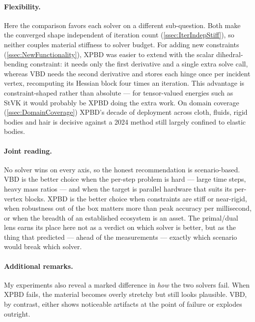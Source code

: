 \paragraph{Flexibility.}
Here the comparison favors each solver on a different sub-question. Both make
the converged shape independent of iteration count
(\autoref{ssec:IterIndepStiff}), so neither couples material stiffness to solver
budget. For adding new constraints (\autoref{ssec:NewFunctionality}), XPBD was
easier to extend with the scalar dihedral-bending constraint: it needs only the
first derivative and a single extra solve call, whereas VBD needs the second
derivative and stores each hinge once per incident vertex, recomputing its
Hessian block four times an iteration. This advantage is constraint-shaped rather
than absolute --- for tensor-valued energies such as StVK it would probably be
XPBD doing the extra work. On domain coverage (\autoref{ssec:DomainCoverage}) XPBD's decade
of deployment across cloth, fluids, rigid bodies and hair is decisive against a
2024 method still largely confined to elastic bodies.

\paragraph{Joint reading.}
No solver wins on every axis, so the honest recommendation is scenario-based.
VBD is the better choice when the per-step problem is hard --- large time steps,
heavy mass ratios --- and when the target is parallel hardware that suits its
per-vertex blocks. XPBD is the better choice when constraints are stiff or
near-rigid, when robustness out of the box matters more than peak accuracy per
millisecond, or when the breadth of an established ecosystem is an asset. The
primal/dual lens earns its place here not as a verdict on which solver is better,
but as the thing that predicted --- ahead of the measurements --- exactly which
scenario would break which solver.

\paragraph{Additional remarks.}
My experiments also reveal a marked difference in \emph{how} the two solvers fail.
When XPBD fails, the material becomes overly stretchy but still looks plausible.
VBD, by contrast, either shows noticeable artifacts at the point of failure or
explodes outright.

